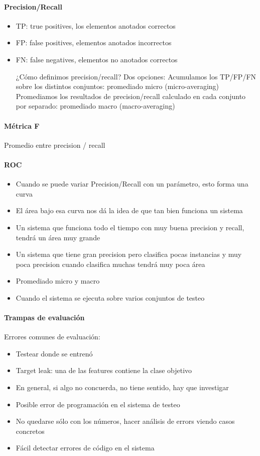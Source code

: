 \documentclass[a4paper,10pt]{article}
\begin{document}
\paragraph {Precision/Recall}
\begin{itemize}
 
\item TP: true positives, los elementos anotados correctos
\item FP: false positives, elementos anotados incorrectos
\item FN: false negatives, elementos no anotados correctos

¿Cómo definimos precision/recall?
Dos opciones:
Acumulamos los TP/FP/FN sobre los distintos conjuntos: promediado micro (micro-averaging)
Promediamos los resultados de precision/recall calculado en cada conjunto por separado: promediado macro (macro-averaging)

\end{itemize}

\paragraph {Métrica F }
Promedio entre precision / recall

\paragraph {ROC}
\begin{itemize}
\item Cuando se puede variar Precision/Recall con un parámetro, esto forma una curva
\item El área bajo esa curva nos dá la idea de que tan bien funciona un sistema
\item Un sistema que funciona todo el tiempo con muy buena precision y recall, tendrá un área muy grande
\item Un sistema que tiene gran precision pero clasifica pocas instancias y muy poca precision cuando clasifica muchas tendrá muy poca área
\item Promediado micro y macro
\item Cuando el sistema se ejecuta sobre varios conjuntos de testeo
\end{itemize}

\paragraph {Trampas de evaluación}
Errores comunes de evaluación:
\begin{itemize}
\item Testear donde se entrenó
\item Target leak: una de las features contiene la clase objetivo
\item En general, si algo no concuerda, no tiene sentido, hay que investigar
\item Posible error de programación en el sistema de testeo
\item No quedarse sólo con los números, hacer análisis de errors viendo casos concretos
\item Fácil detectar errores de código en el sistema
\end{itemize}
\end{document}
